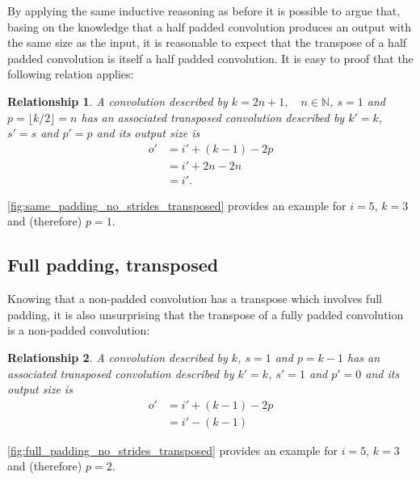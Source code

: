\documentclass[notitlepage]{report}
\newtheorem{relationship}{Relationship}
\begin{document}
By applying the same inductive reasoning as before it is possible to argue that,
basing on the knowledge that a half padded convolution produces an output with
the same size as the input, it is reasonable to expect that the transpose of a
half padded convolution is itself a half padded convolution. It is easy to
proof that the following relation applies:

\begin{relationship}\label{rel:half_padding_no_strides_transposed}
A convolution described by $k = 2n + 1, \quad n \in \mathbb{N}$, $s = 1$ and $p
= \lfloor k / 2 \rfloor = n$ has an associated transposed convolution described
by $k' = k$, $s' = s$ and $p' = p$ and its output size is
\begin{equation*}
\begin{split}
    o' &= i' + (k - 1) - 2p \\
       &= i' + 2n - 2n \\
       &= i'.
\end{split}
\end{equation*}
\end{relationship}

\autoref{fig:same_padding_no_strides_transposed} provides an example for $i =
5$, $k = 3$ and (therefore) $p = 1$.

\subsection{Full padding, transposed}

Knowing that a non-padded convolution has a transpose which involves full
padding, it is also unsurprising that the transpose of a fully padded
convolution is a non-padded convolution:

\begin{relationship}\label{rel:full_padding_no_strides_transposed}
A convolution described by $k$, $s = 1$ and $p = k - 1$ has an associated
transposed convolution described by $k' = k$, $s' = 1$ and $p' = 0$ and its
output size is
\begin{equation*}
\begin{split}
    o' &= i' + (k - 1) - 2p \\
       &= i' - (k - 1)
\end{split}
\end{equation*}
\end{relationship}

\autoref{fig:full_padding_no_strides_transposed} provides an example for $i =
5$, $k = 3$ and (therefore) $p = 2$.
\end{document}

